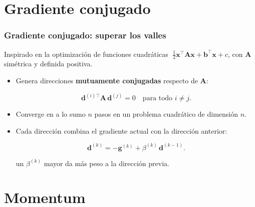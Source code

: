 \documentclass[aspectratio=169, 10pt]{beamer}
\newcommand{\gv}{\bm{g}}
\newcommand{\xv}{\bm{x}}
\newcommand{\dv}{\bm{d}}
\newcommand{\Amat}{\bm{A}}
\newcommand{\formula}[1]{%
	\begin{tcolorbox}[colback=UCMBlue!8, colframe=UCMBlue, arc=4pt,
		boxsep=2pt, left=6pt, right=6pt, top=3pt, bottom=3pt]
		#1
	\end{tcolorbox}
}
\begin{document}
\section{Gradiente conjugado}

\begin{frame}
\frametitle{Gradiente conjugado: superar los valles}
Inspirado en la optimizaci\'on de funciones cuadr\'aticas $\;\tfrac{1}{2}\xv^{\top}\Amat\xv + \bm{b}^{\top}\xv + c$, con $\Amat$ sim\'etrica y definida positiva.
\begin{itemize}
	\item Genera direcciones \textbf{mutuamente conjugadas} respecto de $\Amat$:
	\formula{\[ \dv^{(i)\top}\Amat\,\dv^{(j)} = 0 \quad \text{para todo } i\neq j. \]}
	\pause
	\item Converge en a lo sumo $n$ pasos en un problema cuadr\'atico de dimensi\'on $n$.
	\pause
	\item Cada direcci\'on combina el gradiente actual con la direcci\'on anterior:
	\formula{\[ \dv^{(k)} = -\gv^{(k)} + \beta^{(k)}\,\dv^{(k-1)}. \]}
	un $\beta^{(k)}$ mayor da m\'as peso a la direcci\'on previa.
\end{itemize}
\end{frame}



\section{Momentum}
\end{document}
